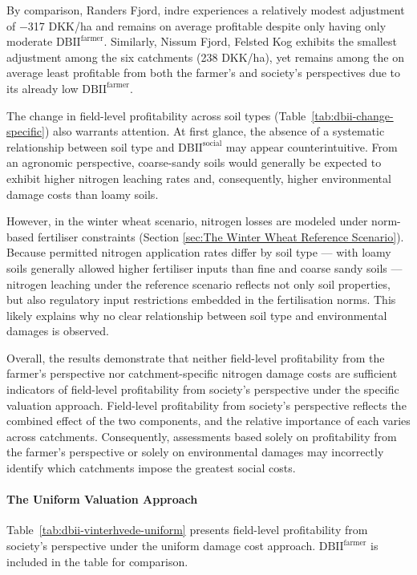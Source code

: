 \documentclass[12pt]{article}
\begin{document}
By comparison, Randers Fjord, indre experiences a relatively modest adjustment of $-$317 DKK/ha and remains on average profitable despite only having only moderate $\mathrm{DBII^{farmer}}$. 
Similarly, Nissum Fjord, Felsted Kog exhibits the smallest adjustment among the six catchments (238 DKK/ha), yet remains among the on average least profitable from both the farmer's and society's perspectives due to its already low $\mathrm{DBII^{farmer}}$. 


The change in field-level profitability across soil types (Table~\ref{tab:dbii-change-specific}) also warrants attention.
At first glance, the absence of a systematic relationship between soil type and $\mathrm{DBII^{social}}$ may appear counterintuitive. 
From an agronomic perspective, coarse-sandy soils would generally be expected to exhibit higher nitrogen leaching rates and, consequently, higher environmental damage costs than loamy soils.

However, in the winter wheat scenario, nitrogen losses are modeled under norm-based fertiliser constraints (Section \ref{sec:The Winter Wheat Reference Scenario}). 
Because permitted nitrogen application rates differ by soil type --- with loamy soils generally allowed higher fertiliser inputs than fine and coarse sandy soils --- 
nitrogen leaching under the reference scenario reflects not only soil properties, but also regulatory input restrictions embedded in the fertilisation norms. 
This likely explains why no clear relationship between soil type and environmental damages is observed.

Overall, the results demonstrate that neither field-level profitability from the farmer's perspective nor catchment-specific nitrogen damage costs are sufficient indicators of field-level profitability from society's perspective under the specific valuation approach. 
Field-level profitability from society's perspective reflects the combined effect of the two components, and the relative importance of each varies across catchments. 
Consequently, assessments based solely on profitability from the farmer's perspective or solely on environmental damages may incorrectly identify which catchments impose the greatest social costs. 


\paragraph{The Uniform Valuation Approach}

Table~\ref{tab:dbii-vinterhvede-uniform} presents field-level profitability from society's perspective under the uniform damage cost approach. $\mathrm{DBII^{farmer}}$ is included in the table for comparison.
\end{document}
